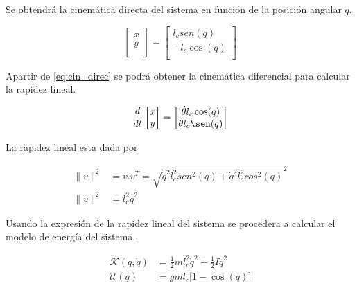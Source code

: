\documentclass[a4paper]{IEEEtran} %
\begin{document}
Se obtendrá la cinemática directa del sistema en función de la posición angular $q$.

\begin{equation}
    \begin{bmatrix}  x \\ y \\
    \end{bmatrix}=
    \begin{bmatrix} l_csen(q) \\ -l_c\cos(q)  \\
    \end{bmatrix}
    \label{eq:cin_direc}
\end{equation}

Apartir de \ref{eq:cin_direc} se podrá obtener la cinemática diferencial para calcular la rapidez lineal.

\begin{equation}
    \frac{d}{dt}\begin{bmatrix}
        x \\
        y \\
    \end{bmatrix}=
    \begin{bmatrix}
        \dot{\theta}l_c\cos(q)  \\
        \dot{\theta}l_c\sen(q)  \\
    \end{bmatrix}
    \label{eq:speed}
\end{equation}

La rapidez lineal esta dada por

\begin{equation}
    \begin{split}
        \|v\|^2&=v.v^T=\sqrt{\dot{q}^2l_c^2sen^2({q})+\dot{q}^2l_c^2cos^2({q})}^2\\
        \|v\|^2&=l_c^2\dot{q}^2
    \end{split}
    \label{eq:speed_mod}
\end{equation}

Usando la expresión de la rapidez lineal del sistema se procedera a calcular el modelo de energía del sistema.

\begin{equation}
    \begin{split}
        \mathcal{K}(q,\dot{q}) &= \frac{1}{2}ml_c^2\dot q^2+\frac{1}{2}I\dot q^2\\
        \mathcal{U}(q) &= gml_c\lbrack1-\cos({q})\rbrack
    \end{split}
    \label{eq:energy}
\end{equation}
\end{document}
